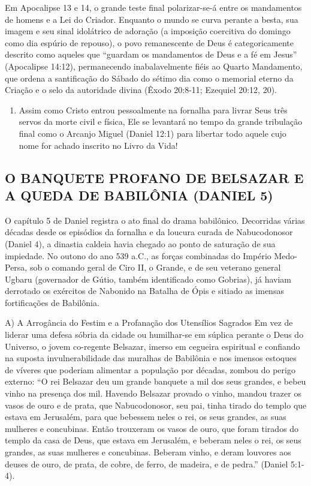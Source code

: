 \documentclass[11pt,a4paper,openany]{book}
\begin{document}
Em Apocalipse 13 e 14, o grande teste final polarizar-se-á entre os mandamentos de homens e a Lei do Criador. Enquanto o mundo se curva perante a besta, sua imagem e seu sinal idolátrico de adoração (a imposição coercitiva do domingo como dia espúrio de repouso), o povo remanescente de Deus é categoricamente descrito como aqueles que ``guardam os mandamentos de Deus e a fé em Jesus'' (Apocalipse 14:12), permanecendo inabalavelmente fiéis ao Quarto Mandamento, que ordena a santificação do Sábado do sétimo dia como o memorial eterno da Criação e o selo da autoridade divina (Êxodo 20:8-11; Ezequiel 20:12, 20).
\begin{enumerate}
  \item Assim como Cristo entrou pessoalmente na fornalha para livrar Seus três servos da morte civil e física, Ele se levantará no tempo da grande tribulação final como o Arcanjo Miguel (Daniel 12:1) para libertar todo aquele cujo nome for achado inscrito no Livro da Vida!
\end{enumerate}




\subsection{O BANQUETE PROFANO DE BELSAZAR E A QUEDA DE BABILÔNIA (DANIEL 5)}


O capítulo 5 de Daniel registra o ato final do drama babilônico. Decorridas várias décadas desde os episódios da fornalha e da loucura curada de Nabucodonosor (Daniel 4), a dinastia caldeia havia chegado ao ponto de saturação de sua impiedade. No outono do ano 539 a.C., as forças combinadas do Império Medo-Persa, sob o comando geral de Ciro II, o Grande, e de seu veterano general Ugbaru (governador de Gútio, também identificado como Gobrias), já haviam derrotado os exércitos de Nabonido na Batalha de Ópis e sitiado as imensas fortificações de Babilônia.

A) A Arrogância do Festim e a Profanação dos Utensílios Sagrados
Em vez de liderar uma defesa sóbria da cidade ou humilhar-se em súplica perante o Deus do Universo, o jovem co-regente Belsazar, imerso em cegueira espiritual e confiando na suposta invulnerabilidade das muralhas de Babilônia e nos imensos estoques de víveres que poderiam alimentar a população por décadas, zombou do perigo externo:
``O rei Belsazar deu um grande banquete a mil dos seus grandes, e bebeu vinho na presença dos mil. Havendo Belsazar provado o vinho, mandou trazer os vasos de ouro e de prata, que Nabucodonosor, seu pai, tinha tirado do templo que estava em Jerusalém, para que bebessem neles o rei, os seus grandes, as suas mulheres e concubinas. Então trouxeram os vasos de ouro, que foram tirados do templo da casa de Deus, que estava em Jerusalém, e beberam neles o rei, os seus grandes, as suas mulheres e concubinas. Beberam vinho, e deram louvores aos deuses de ouro, de prata, de cobre, de ferro, de madeira, e de pedra.'' (Daniel 5:1-4).
\end{document}
